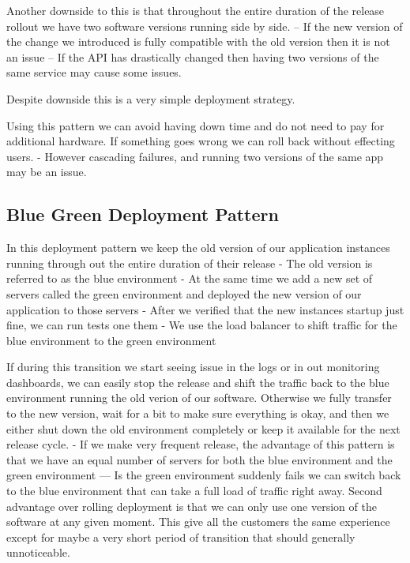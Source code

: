 \documentclass[a4paper, 11pt]{book}
\begin{document}
    Another downside to this is that throughout the entire duration of the release rollout we have two software versions running side by side.
    -- If the new version of the change we introduced is fully compatible with the old version then it is not an issue
    -- If the API has drastically changed then having two versions of the same service may cause some issues.

    Despite downside this is a very simple deployment strategy.

    Using this pattern we can avoid having down time and do not need to pay for additional hardware.
    If something goes wrong we can roll back without effecting users.
    - However cascading failures, and running two versions of the same app may be an issue.

    \subsection{Blue Green Deployment Pattern}
    In this deployment pattern we keep the old version of our application instances running through out the entire duration of their release
    - The old version is referred to as the blue environment
    - At the same time we add a new set of servers called the green environment and deployed the new version of our application to those servers
    - After we verified that the new instances startup just fine, we can run tests one them
    - We use the load balancer to shift traffic for the blue environment to the green environment

    If during this transition we start seeing issue in the logs or in out monitoring dashboards, we can easily stop the release and shift the traffic back to the blue environment running the old verion of our software.
    Otherwise we fully transfer to the new version, wait for a bit to make sure everything is okay, and then we either shut down the old environment completely or keep it available for the next release cycle.
    - If we make very frequent release, the advantage of this pattern is that we have an equal number of servers for both the blue environment and the green environment
    --- Is the green environment suddenly fails we can switch back to the blue environment that can take a full load of traffic right away.
    Second advantage over rolling deployment is that we can only use one version of the software at any given moment.
    This give all the customers the same experience except for maybe a very short period of transition that should generally unnoticeable.
\end{document}
